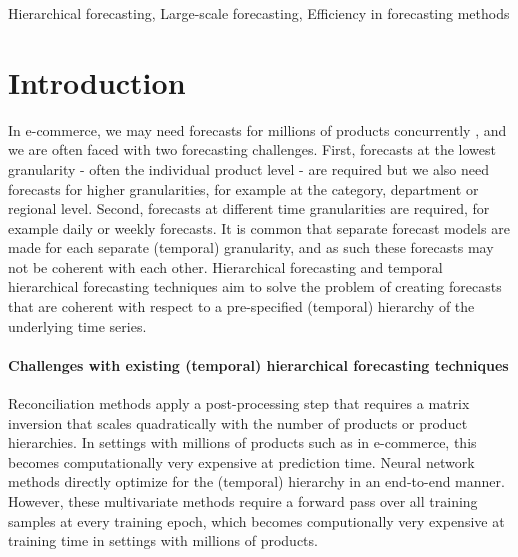 \documentclass[preprint, 3p, times, twocolumn]{elsarticle}
\begin{document}
\begin{frontmatter}
\begin{abstract}

\end{abstract}

\begin{keyword}
  Hierarchical forecasting, Large-scale forecasting, Efficiency in forecasting methods
\end{keyword}

\end{frontmatter}


\section{Introduction}
In e-commerce, we may need forecasts for millions of products concurrently \cite{bose_probabilistic_2017}, and we are often faced with two forecasting challenges. First, forecasts at the lowest granularity - often the individual product level - are required but we also need forecasts for higher granularities, for example at the category, department or regional level. Second, forecasts at different time granularities are required, for example daily or weekly forecasts. It is common that separate forecast models are made for each separate (temporal) granularity, and as such these forecasts may not be coherent with each other. Hierarchical forecasting \cite{hyndman_optimal_2011} and temporal hierarchical forecasting techniques \cite{athanasopoulos_forecasting_2017,rangapuram_coherent_2023,theodosiou_forecasting_2021} aim to solve the problem of creating forecasts that are coherent with respect to a pre-specified (temporal) hierarchy of the underlying time series. 

\paragraph{Challenges with existing (temporal) hierarchical forecasting techniques} Reconciliation methods \cite{hyndman_optimal_2011,athanasopoulos_forecasting_2017,wickramasuriya_optimal_2019} apply a post-processing step that requires a matrix inversion that scales quadratically with the number of products or product hierarchies. In settings with millions of products such as in e-commerce, this becomes computationally very expensive at prediction time. Neural network methods \cite{rangapuram_endtoend_2021,rangapuram_coherent_2023} directly optimize for the (temporal) hierarchy in an end-to-end manner. However, these multivariate methods require a forward pass over all training samples at every training epoch, which becomes computionally very expensive at training time in settings with millions of products. 
  
\end{document}
